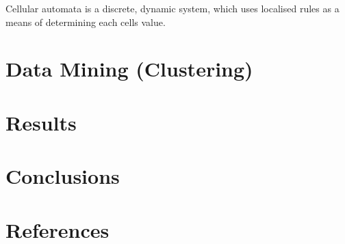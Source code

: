 \documentclass[11pt]{article}
\begin{document}
  Cellular automata is a discrete, dynamic system, which uses
  localised rules as a means of determining each cells value.  
  
\section{Data Mining (Clustering)}
\label{sec-3}

  
\section{Results}
\label{sec-4}

  
\section{Conclusions}
\label{sec-5}

  
\section{References}
\label{sec-6}




\end{document}
